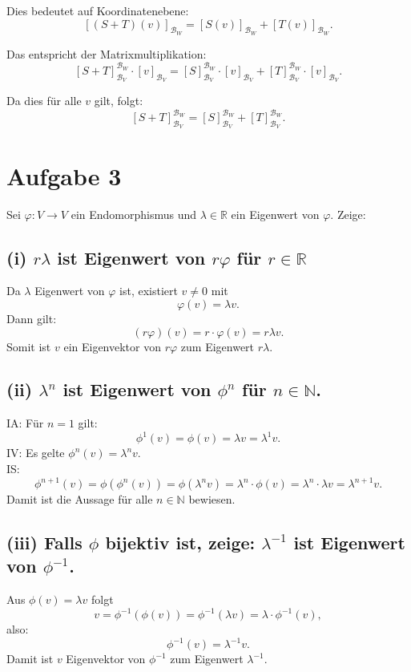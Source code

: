 \documentclass{article}
\begin{document}
Dies bedeutet auf Koordinatenebene:
\[
[(S+T)(v)]_{\mathcal{B}_W} = [S(v)]_{\mathcal{B}_W} + [T(v)]_{\mathcal{B}_W}.
\]

Das entspricht der Matrixmultiplikation:
\[
[S+T]_{\mathcal{B}_V}^{\mathcal{B}_W} \cdot [v]_{\mathcal{B}_V} = [S]_{\mathcal{B}_V}^{\mathcal{B}_W} \cdot [v]_{\mathcal{B}_V} + [T]_{\mathcal{B}_V}^{\mathcal{B}_W} \cdot [v]_{\mathcal{B}_V}.
\]

Da dies für alle \( v \) gilt, folgt:
\[
[S+T]_{\mathcal{B}_V}^{\mathcal{B}_W} = [S]_{\mathcal{B}_V}^{\mathcal{B}_W} + [T]_{\mathcal{B}_V}^{\mathcal{B}_W}.
\]

\section*{Aufgabe 3}

Sei \( \varphi : V \to V \) ein Endomorphismus und \( \lambda \in \mathbb{R} \) ein Eigenwert von \( \varphi \). Zeige:

\subsection*{(i) \( r\lambda \) ist Eigenwert von \( r\varphi \) für \( r \in \mathbb{R} \)}

Da \( \lambda \) Eigenwert von \( \varphi \) ist, existiert \( v \neq 0 \) mit
\[
\varphi(v) = \lambda v.
\]
Dann gilt:
\[
(r\varphi)(v) = r \cdot \varphi(v) = r \lambda v.
\]
Somit ist \( v \) ein Eigenvektor von \( r\varphi \) zum Eigenwert \( r\lambda \).

\subsection*{(ii) \(\lambda^n\) ist Eigenwert von \(\phi^n\) für \(n \in \mathbb{N}\).}
IA: Für \(n = 1\) gilt:
\[
\phi^1(v) = \phi(v) = \lambda v = \lambda^1 v.
\]
IV: Es gelte \(\phi^n(v) = \lambda^n v\).\\
IS:
\[
\phi^{n+1}(v) = \phi(\phi^n(v)) = \phi(\lambda^n v) = \lambda^n \cdot \phi(v) = \lambda^n \cdot \lambda v = \lambda^{n+1} v.
\]
Damit ist die Aussage für alle \(n \in \mathbb{N}\) bewiesen.

\subsection*{(iii) Falls $\phi$ bijektiv ist, zeige: $\lambda^{-1}$ ist Eigenwert von $\phi^{-1}$.}
Aus \(\phi(v) = \lambda v\) folgt
\[
v = \phi^{-1}(\phi(v)) = \phi^{-1}(\lambda v) = \lambda \cdot \phi^{-1}(v),
\]
also:
\[
\phi^{-1}(v) = \lambda^{-1} v.
\]
Damit ist \(v\) Eigenvektor von \(\phi^{-1}\) zum Eigenwert \(\lambda^{-1}\).
\end{document}
